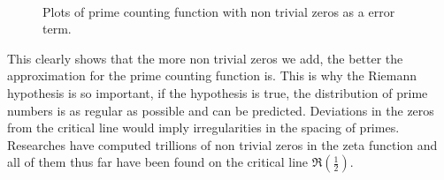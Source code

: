 \documentclass[12pt]{amsart} %
\theoremstyle{definition}
\theoremstyle{remark}
\numberwithin{equation}{section}
\begin{document}
   \begin{figure}[h!]
        \hfill
        \\
        
        \hfill
        \caption{Plots of prime counting function with non trivial zeros as a error term.}
        \label{fig:fig}
    \end{figure}
    
   
   
   This clearly shows that the more non trivial zeros we add, the better the approximation for the prime counting function is. This is why the Riemann hypothesis is so important, if the hypothesis is true, the distribution of prime numbers is as regular as possible and can be predicted. Deviations in the zeros from the critical line would imply irregularities in the spacing of primes. Researches have computed trillions of non trivial zeros in the zeta function and all of them thus far have been found on the critical line $\Re(\frac{1}{2})$. 
\end{document}
